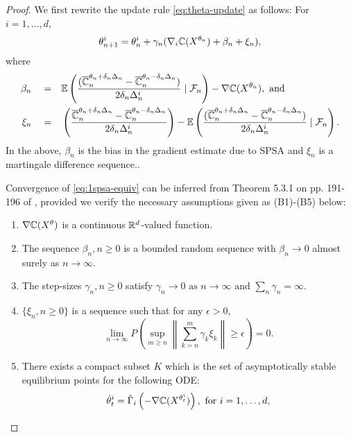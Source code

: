 \documentclass{article}
\numberwithin{equation}{section}
\numberwithin{theorem}{section}
\begin{document}
\begin{proof}

We first rewrite the update rule \eqref{eq:theta-update} as follows: For $i=1,\ldots,d$,
\begin{align}
\theta^{i}_{n+1}  =  \theta^{i}_n +  \gamma_n(\nabla_{i} \mathbb{C}(X^{\theta_n}) + \beta_n + \xi_n), 
\label{eq:1spsa-equiv}
\end{align}
where 
\begin{align*}
\beta_n \quad= &\quad \mathbb{E}\left(\dfrac{(\overline {\mathbb{C}}_n^{\theta_n + \delta_n \Delta_n} -\overline {\mathbb{C}}_n^{\theta_n - \delta_n \Delta_n})}{2 \delta_n \Delta_n^{i}} \mid \mathcal{F}_n \right) - \nabla \mathbb{C}(X^{\theta_n}), \text{ and}\\
\xi_n \quad = & \quad\left(\dfrac{\overline {\mathbb{C}}_n^{\theta_n + \delta_n \Delta_n} -\overline {\mathbb{C}}_n^{\theta_n - \delta_n \Delta_n}}{2 \delta_n\Delta_n^{i}}\right)  - \mathbb{E}\left(\dfrac{(\overline {\mathbb{C}}_n^{\theta_n + \delta_n \Delta_n} -\overline {\mathbb{C}}_n^{\theta_n - \delta_n \Delta_n})}{2 \delta_n \Delta_n^{i}}\mid \mathcal{F}_n \right).
\end{align*}
In the above, $\beta_n$ is the bias in the gradient estimate due to SPSA and $\xi_n$ is a martingale difference sequence..

Convergence of \eqref{eq:1spsa-equiv} can be inferred from Theorem 5.3.1 on pp. 191-196 of \cite{kushner-clark}, provided we verify the necessary assumptions given as (B1)-(B5) below:
\begin{enumerate}[\bfseries (B1)]
\item $\nabla \mathbb{C}(X^{\theta})$ is a continuous $\mathbb{R}^{d}$-valued function.
\item  The sequence $\beta_n,n\geq 0$ is a bounded random sequence with
$\beta_n \rightarrow 0$ almost surely as $n\rightarrow \infty$.
\item The step-sizes $\gamma_n,n\geq 0$ satisfy
$  \gamma_n\rightarrow 0 \mbox{ as }n\rightarrow\infty \text{ and } \sum_n \gamma_n=\infty.$
\item $\{\xi_n, n\ge 0\}$ is a sequence such that for any $\epsilon>0$,
\[ \lim_{n\rightarrow\infty} P\left( \sup_{m\geq n}  \left\|
\sum_{k=n}^{m} \gamma_k \xi_k\right\| \geq \epsilon \right) = 0. \]
\item There exists a compact subset $K$ which is the set of asymptotically stable equilibrium points for the following ODE:
\begin{align}
\dot\theta^{i}_t = \check\Gamma_{i}\left(- \nabla \mathbb{C}(X^{\theta^{i}_t})\right), \text{ for } i=1,\dots,d,\label{eq:pi-ode}
\end{align}
\end{enumerate} 


\end{proof}
\end{document}
